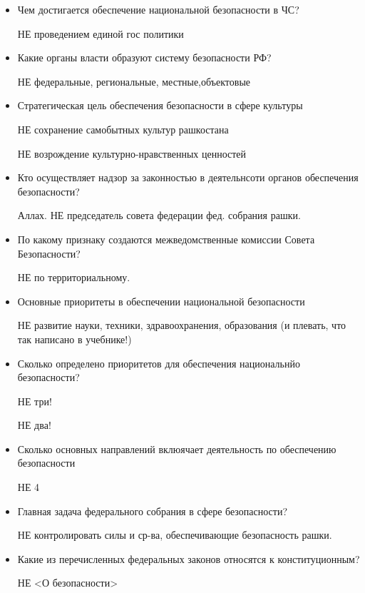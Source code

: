 \documentclass[oneside,final,14pt]{extreport}
\begin{document}
\begin{itemize}
	\item Чем достигается обеспечение национальной безопасности в ЧС?
	
	НЕ проведением единой гос политики
	
	\item Какие органы власти образуют систему безопасности РФ?
	
	НЕ федеральные, региональные, местные,объектовые
	
	\item Стратегическая цель обеспечения безопасности в сфере культуры
	
	НЕ сохранение самобытных культур рашкостана
	
	НЕ возрождение культурно-нравственных ценностей 
	
	\item Кто осуществляет надзор за законностью в деятельнсоти органов обеспечения безопасности?
	
	Аллах. НЕ председатель  совета федерации фед. собрания рашки.
	
	\item По какому признаку создаются межведомственные комиссии Совета Безопасности?
	
	НЕ по территориальному.
	
	\item Основные приоритеты в обеспечении национальной безопасности
	
	НЕ развитие науки, техники, здравоохранения, образования (и плевать, что так написано в учебнике!)
	
	\item Сколько определено приоритетов для обеспечения национальнйо безопасности?
	
	НЕ три!
	
	НЕ два!
	
	 \item Сколько основных направлений вклюячает деятельность по обеспечению безопасности
	 
	 НЕ 4 
	
	\item Главная задача федерального собрания в сфере безопасности?
	
	НЕ контролировать силы и ср-ва, обеспечивающие безопасность рашки.
	
	\item Какие из перечисленных федеральных законов относятся к конституционным?
	
	НЕ <О безопасности>
	

\end{itemize}
\end{document}

